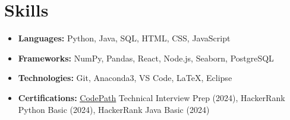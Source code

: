 \documentclass[letterpaper,11pt]{article}
\makeatletter
\newcommand{\resumeItem}[1]{
  \item\small{
    {#1 \vspace{-3pt}}
  }
}
\newcommand{\resumeSubheading}[4]{
  \vspace{-2pt}\item
    \begin{tabular*}{0.97\textwidth}[t]{l@{\extracolsep{\fill}}r@{\hspace{-0.2in}}}
        \textbf{#1} & #2 \\
        \textit{\small#3} & \textit{\small #4} \\
    \end{tabular*}\vspace{-1pt}
}
\newcommand{\resumeSubHeadingListStart}{\begin{itemize}[leftmargin=0.00in, rightmargin=-0.2in, label={}]}
\newcommand{\resumeItemListStart}{\begin{itemize}[leftmargin=0.15in, rightmargin=0.15in]}
\newcommand{\resumeItemListEnd}{\end{itemize}\vspace{-3pt}}
\makeatother
\begin{document}
\section{Skills}
    \vspace*{3pt}
    \begin{itemize}[itemsep=-0.05in, leftmargin=0.05in, label={}]
        \item \small{
            \textbf{Languages: } Python, Java, SQL, HTML, CSS, JavaScript
        }
        \item \small{
            \textbf{Frameworks: } NumPy, Pandas, React, Node.js, Seaborn, PostgreSQL
        }
        \item \small{
            \textbf{Technologies: } Git, Anaconda3, VS Code, LaTeX, Eclipse
        }
        \item \small{
            \textbf{Certifications: } \href{https://www.codepath.org/}{\underline{CodePath}} Technical Interview Prep (2024), HackerRank Python Basic (2024), HackerRank Java Basic (2024)
        }
    \end{itemize}



\end{document}
